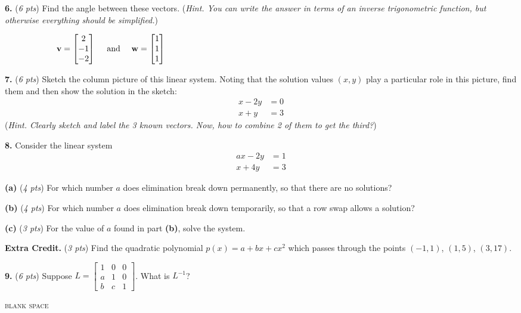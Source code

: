 \documentclass[11pt]{amsart}
\newcommand{\bv}{\mathbf{v}}
\newcommand{\bw}{\mathbf{w}}
\newcommand{\ds}{\displaystyle}
\newcommand{\prob}[1]{\bigskip\noindent\textbf{#1.} }
\newcommand{\pts}[1]{(\emph{#1 pts})}
\newcommand{\probpts}[2]{\prob{#1} \pts{#2} \quad}
\newcommand{\epartpts}[2]{\medskip\noindent \textbf{(#1)} \pts{#2} \quad}
\begin{document}
\clearpage
\newpage
\probpts{6}{6}  Find the angle between these vectors.  (\emph{Hint.  You can write the answer in terms of an inverse trigonometric function, but otherwise everything should be simplified.})

    $$\bv = \begin{bmatrix} 2 \\ -1 \\ -2 \end{bmatrix} \quad \text{ and } \quad \bw = \begin{bmatrix} 1 \\ 1 \\ 1 \end{bmatrix} \hspace{5.0in}$$
\vfill

\probpts{7}{6}  Sketch the column picture of this linear system.  Noting that the solution values $(x,y)$ play a particular role in this picture, find them and then show the solution in the sketch:
\begin{align*}
x - 2 y &= 0 \\
x + y &= 3
\end{align*}
(\emph{Hint.  Clearly sketch and label the 3 known vectors.  Now, how to combine 2 of them to get the third?})
\vfill

\clearpage
\newpage
\prob{8}  Consider the linear system
\begin{align*}
a x - 2 y &= 1 \\
x + 4 y &= 3
\end{align*}

\epartpts{a}{4} For which number $a$ does elimination break down permanently, so that there are no solutions?
\vfill

\epartpts{b}{4} For which number $a$ does elimination break down temporarily, so that a row swap allows a solution?
\vfill

\epartpts{c}{3} For the value of $a$ found in part \textbf{(b)}, solve the system.
\vspace{2.0in}

\probpts{Extra Credit}{3}  Find the quadratic polynomial $p(x) = a + b x + c x^2$ which passes through the points $(-1,1)$, $(1,5)$, $(3,17)$.
\vspace{2.0in}

\clearpage
\newpage
\probpts{9}{6}  Suppose $\ds L = \begin{bmatrix} 1 & 0 & 0 \\ a & 1 & 0 \\ b & c & 1 \end{bmatrix}$.  What is $L^{-1}$?
\vfill

\noindent \hrulefill
\begin{center}
\small
\textsc{blank space}
\end{center}
\vfill
\end{document}
